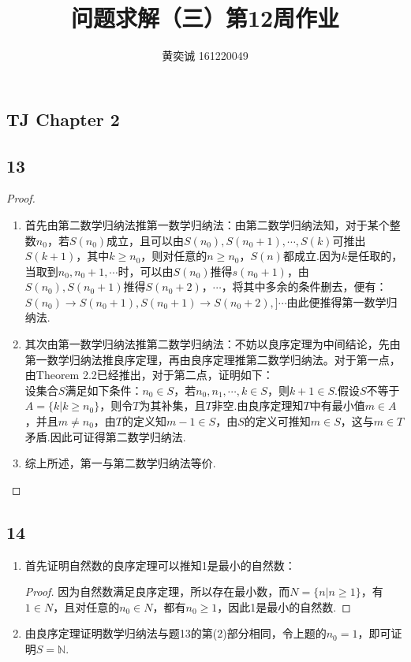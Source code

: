 \documentclass[twocolumn]{article}
\newenvironment{SChinese}{
	\CJKfamily{gbsn}
	\CJKtilde
	\CJKnospace}{}
\begin{document}
	\begin{CJK}{UTF8}{}	
		\begin{SChinese}	
			\title{问题求解（三）第12周作业}
			\author{黄奕诚 161220049}
			\maketitle
			
			\section*{TJ Chapter 2}
				\subsection*{13}
					\begin{proof}
						\begin{enumerate}[(1)]
							\item 首先由第二数学归纳法推第一数学归纳法：由第二数学归纳法知，对于某个整数$n_0$，若$S(n_0)$成立，且可以由$S(n_0),S(n_0+1),\cdots,S(k)$可推出$S(k+1)$，其中$k\ge n_0$，则对任意的$n\ge n_0$，$S(n)$都成立.因为$k$是任取的，当取到$n_0,n_0+1,\cdots$时，可以由$S(n_0)$推得$s(n_0+1)$，由$S(n_0),S(n_0+1)$推得$S(n_0+2)$，$\cdots$，将其中多余的条件删去，便有：$S(n_0)\rightarrow S(n_0+1),S(n_0+1)\rightarrow S(n_0+2),]\cdots$由此便推得第一数学归纳法.
							\item 其次由第一数学归纳法推第二数学归纳法：不妨以良序定理为中间结论，先由第一数学归纳法推良序定理，再由良序定理推第二数学归纳法。对于第一点，由Theorem 2.2已经推出，对于第二点，证明如下：\\
							设集合$S$满足如下条件：$n_0\in S$，若$n_0,n_1,\cdots,k\in S$，则$k+1\in S$.假设$S$不等于$A=\{k|k\ge n_0\}$，则令$T$为其补集，且$T$非空.由良序定理知$T$中有最小值$m\in A$，并且$m\neq n_0$，由$T$的定义知$m-1\in S$，由$S$的定义可推知$m\in S$，这与$m\in T$矛盾.因此可证得第二数学归纳法.
							\item 综上所述，第一与第二数学归纳法等价.
						\end{enumerate}
					\end{proof}
				\subsection*{14}
					\begin{enumerate}[(1)]
						\item 首先证明自然数的良序定理可以推知1是最小的自然数：\begin{proof}
							因为自然数满足良序定理，所以存在最小数，而$N=\{n|n\ge1\}$，有$1\in N$，且对任意的$n_0\in N$，都有$n_0\ge1$，因此1是最小的自然数.
						\end{proof}
						\item 由良序定理证明数学归纳法与题13的第(2)部分相同，令上题的$n_0=1$，即可证明$S=\mathbb{N}$.
					\end{enumerate}

\end{SChinese}
\end{CJK}
\end{document}
